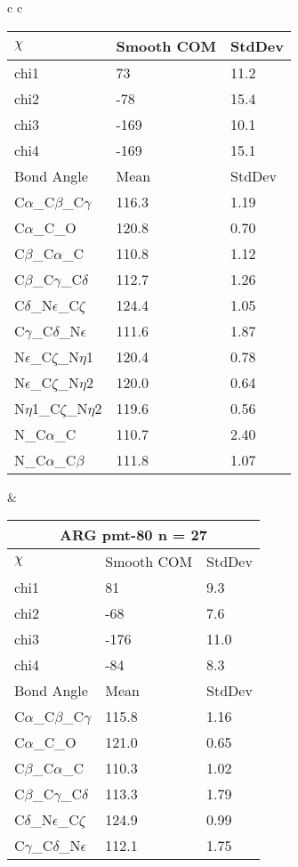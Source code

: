 \begin{longtable}{ c c }
\begin{tabular}{ l l l }
  $\chi$       & Smooth COM & StdDev \\ \midrule
  chi1 & 73 & 11.2 \\ 
  chi2 & -78 & 15.4 \\ 
  chi3 & -169 & 10.1 \\ 
  chi4 & -169 & 15.1 \\ \midrule
  Bond Angle   & Mean     & StdDev \\ \midrule
  C$\alpha$\_C$\beta$\_C$\gamma$ & 116.3 & 1.19\\
  C$\alpha$\_C\_O & 120.8 & 0.70\\
  C$\beta$\_C$\alpha$\_C & 110.8 & 1.12\\
  C$\beta$\_C$\gamma$\_C$\delta$ & 112.7 & 1.26\\
  C$\delta$\_N$\epsilon$\_C$\zeta$ & 124.4 & 1.05\\
  C$\gamma$\_C$\delta$\_N$\epsilon$ & 111.6 & 1.87\\
  N$\epsilon$\_C$\zeta$\_N$\eta$1 & 120.4 & 0.78\\
  N$\epsilon$\_C$\zeta$\_N$\eta$2 & 120.0 & 0.64\\
  N$\eta$1\_C$\zeta$\_N$\eta$2 & 119.6 & 0.56\\
  N\_C$\alpha$\_C & 110.7 & 2.40\\
  N\_C$\alpha$\_C$\beta$ & 111.8 & 1.07\\
  \bottomrule
  \end{tabular}
  &
  \begin{tabular}{ l l l }
  \toprule
  \multicolumn{3}{c}{ARG \textbf{pmt-80} n = 27} \\ \toprule
  $\chi$       & Smooth COM & StdDev \\ \midrule
  chi1 & 81 & 9.3 \\ 
  chi2 & -68 & 7.6 \\ 
  chi3 & -176 & 11.0 \\ 
  chi4 & -84 & 8.3 \\ \midrule
  Bond Angle   & Mean     & StdDev \\ \midrule
  C$\alpha$\_C$\beta$\_C$\gamma$ & 115.8 & 1.16\\
  C$\alpha$\_C\_O & 121.0 & 0.65\\
  C$\beta$\_C$\alpha$\_C & 110.3 & 1.02\\
  C$\beta$\_C$\gamma$\_C$\delta$ & 113.3 & 1.79\\
  C$\delta$\_N$\epsilon$\_C$\zeta$ & 124.9 & 0.99\\
  C$\gamma$\_C$\delta$\_N$\epsilon$ & 112.1 & 1.75\\

\end{tabular}
\end{longtable}
